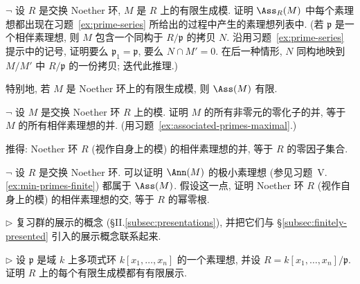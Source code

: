 \begin{prob}\label{ex:associated-primes-list}
$\neg$ 设 $R$ 是交换 Noether 环, $M$ 是 $R$ 上的有限生成模. 证明 $\Ass_R(M)$ 中每个素理想都出现在习题~\ref{ex:prime-series} 所给出的过程中产生的素理想列表中. (若 $\mathfrak{p}$ 是一个相伴素理想, 则 $M$ 包含一个同构于 $R/\mathfrak{p}$ 的拷贝 $N$. 沿用习题~\ref{ex:prime-series} 提示中的记号, 证明要么 $\mathfrak{p}_1=\mathfrak{p}$, 要么 $N\cap M'=0$. 在后一种情形, $N$ 同构地映到 $M/M'$ 中 $R/\mathfrak{p}$ 的一份拷贝; 迭代此推理.)

特别地, 若 $M$ 是 Noether 环上的有限生成模, 则 $\Ass(M)$ 有限.
\end{prob}

\begin{prob}\label{ex:ass-union}
$\neg$ 设 $M$ 是交换 Noether 环 $R$ 上的模. 证明 $M$ 的所有非零元的零化子的并, 等于 $M$ 的所有相伴素理想的并. (用习题~\ref{ex:associated-primes-maximal}.)

推得: Noether 环 $R$ (视作自身上的模) 的相伴素理想的并, 等于 $R$ 的零因子集合.
\end{prob}

\begin{prob}\label{ex:minimal-primes-ass}
$\neg$ 设 $R$ 是交换 Noether 环. 可以证明 $\Ann(M)$ 的极小素理想 (参见习题~V.\ref{ex:min-primes-finite}) 都属于 $\Ass(M)$. 假设这一点, 证明 Noether 环 $R$ (视作自身上的模) 的相伴素理想的交, 等于 $R$ 的幂零根.
\end{prob}

\begin{prob}\label{ex:group-presentation}
$\triangleright$ 复习群的展示的概念 (§II.\ref{subsec:presentations}), 并把它们与 §\ref{subsec:finitely-presented} 引入的展示概念联系起来.
\end{prob}

\begin{prob}\label{ex:finite-presentation-quotient}
$\triangleright$ 设 $\mathfrak{p}$ 是域 $k$ 上多项式环 $k[x_1,\ldots,x_n]$ 的一个素理想, 并设 $R=k[x_1,\ldots,x_n]/\mathfrak{p}$. 证明 $R$ 上的每个有限生成模都有有限展示.
\end{prob}

